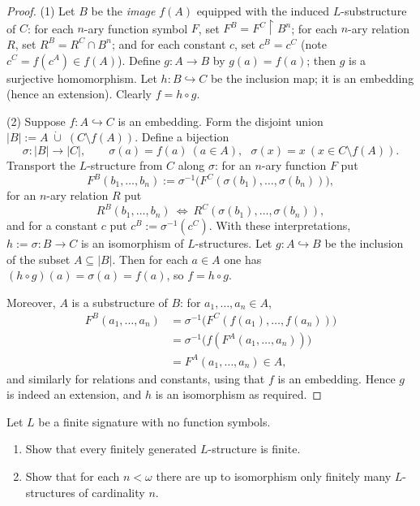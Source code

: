 \begin{proof}
    (1) Let $B$ be the \emph{image} $f(A)$ equipped with the induced $L$-substructure of $C$:
    for each $n$-ary function symbol $F$, set $F^B=F^C\!\upharpoonright B^n$; for each $n$-ary relation
    $R$, set $R^B=R^C\cap B^n$; and for each constant $c$, set $c^B=c^C$ (note $c^C=f(c^A)\in f(A)$).
    Define $g\colon A\to B$ by $g(a)=f(a)$; then $g$ is a surjective homomorphism.
    Let $h\colon B\hookrightarrow C$ be the inclusion map; it is an embedding (hence an extension).
    Clearly $f=h\circ g$.


    (2) Suppose $f\colon A\hookrightarrow C$ is an embedding. Form the disjoint union
    $|B|:=A\;\dot\cup\;(C\setminus f(A))$. Define a bijection
    \[
        \sigma\colon |B|\longrightarrow |C|,\qquad
        \sigma(a)=f(a)\ (a\in A),\ \ \ \sigma(x)=x\ (x\in C\setminus f(A)).
    \]
    Transport the $L$-structure from $C$ along $\sigma$: for an $n$-ary function $F$ put
    \[
        F^B(b_1,\dots,b_n):=\sigma^{-1}\!\big(F^C(\sigma(b_1),\dots,\sigma(b_n))\big),
    \]
    for an $n$-ary relation $R$ put
    \[
        R^B(b_1,\dots,b_n)\ \Longleftrightarrow\ R^C(\sigma(b_1),\dots,\sigma(b_n)),
    \]
    and for a constant $c$ put $c^B:=\sigma^{-1}(c^C)$. With these interpretations,
    $h:=\sigma\colon B\to C$ is an isomorphism of $L$-structures.
    Let $g\colon A\hookrightarrow B$ be the inclusion of the subset $A\subseteq |B|$.
    Then for each $a\in A$ one has $(h\circ g)(a)=\sigma(a)=f(a)$, so $f=h\circ g$.

    Moreover, $A$ is a substructure of $B$: for $a_1,\dots,a_n\in A$,
    \[
        \begin{aligned}
            F^B(a_1,\dots,a_n)
             & = \sigma^{-1}\!\big(F^C(f(a_1),\dots,f(a_n))\big) \\
             & = \sigma^{-1}\!\big(f(F^A(a_1,\dots,a_n))\big)    \\
             & = F^A(a_1,\dots,a_n)\in A,
        \end{aligned}
    \]
    and similarly for relations and constants, using that $f$ is an embedding.
    Hence $g$ is indeed an extension, and $h$ is an isomorphism as required.
\end{proof}




\begin{proposition}
    \label{prop:finite-relational-language-finiteness}

    Let \( L \) be a finite signature with no function symbols.
    \begin{enumerate}
        \item Show that every finitely generated \( L \)-structure is finite.
        \item Show that for each \( n < \omega \) there are up to isomorphism only finitely many \( L \)-structures of cardinality \( n \).
    \end{enumerate}
\end{proposition}

